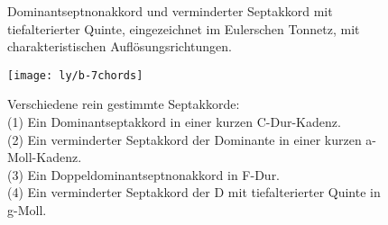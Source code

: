 \begin{figure}
  \centering
  
  \caption{Dominantseptnonakkord und verminderter Septakkord mit tiefalterierter
    Quinte, eingezeichnet im Eulerschen Tonnetz, mit charakteristischen
    Auflösungsrichtungen.}\label{fig:chordLinessevenths2}
\end{figure}

\begin{figure}[h]
	\centering
	\texttt{[image: ly/b-7chords]}
	\caption{Verschiedene rein gestimmte Septakkorde:\\
    \hspace*{3mm}(1) Ein Dominantseptakkord in einer kurzen C-Dur-Kadenz.\\
    \hspace*{3mm}(2) Ein verminderter Septakkord der Dominante in einer kurzen a-Moll-Kadenz.\\
    \hspace*{3mm}(3) Ein Doppeldominantseptnonakkord in F-Dur.\\
    \hspace*{3mm}(4) Ein verminderter Septakkord der
    \raisebox{1px}{D}\hspace*{-4.5px}D mit tiefalterierter Quinte in
    g-Moll.}\label{fig:7chords}
\end{figure}

